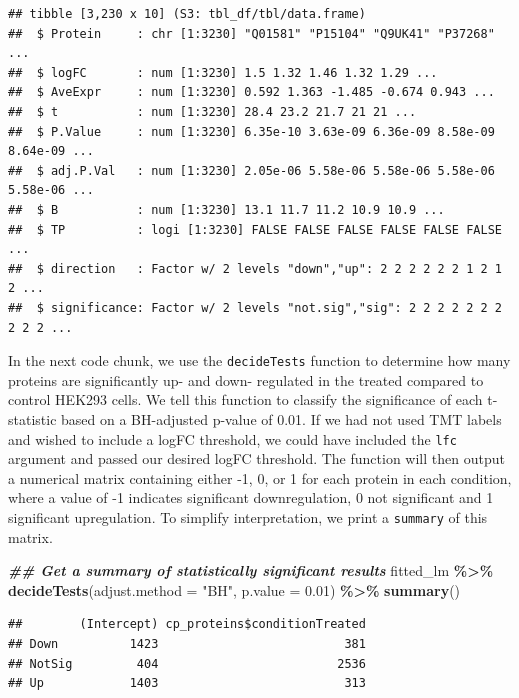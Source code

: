 \documentclass[9pt,a4paper,]{extarticle}
\newenvironment{Shaded}{\begin{snugshade}}{\end{snugshade}}
\newcommand{\AttributeTok}[1]{\textcolor[rgb]{0.13,0.29,0.53}{#1}}
\newcommand{\DocumentationTok}[1]{\textcolor[rgb]{0.56,0.35,0.01}{\textbf{\textit{#1}}}}
\newcommand{\FloatTok}[1]{\textcolor[rgb]{0.00,0.00,0.81}{#1}}
\newcommand{\FunctionTok}[1]{\textcolor[rgb]{0.13,0.29,0.53}{\textbf{#1}}}
\newcommand{\NormalTok}[1]{#1}
\newcommand{\SpecialCharTok}[1]{\textcolor[rgb]{0.81,0.36,0.00}{\textbf{#1}}}
\newcommand{\StringTok}[1]{\textcolor[rgb]{0.31,0.60,0.02}{#1}}
\begin{document}
\begin{verbatim}
## tibble [3,230 x 10] (S3: tbl_df/tbl/data.frame)
##  $ Protein     : chr [1:3230] "Q01581" "P15104" "Q9UK41" "P37268" ...
##  $ logFC       : num [1:3230] 1.5 1.32 1.46 1.32 1.29 ...
##  $ AveExpr     : num [1:3230] 0.592 1.363 -1.485 -0.674 0.943 ...
##  $ t           : num [1:3230] 28.4 23.2 21.7 21 21 ...
##  $ P.Value     : num [1:3230] 6.35e-10 3.63e-09 6.36e-09 8.58e-09 8.64e-09 ...
##  $ adj.P.Val   : num [1:3230] 2.05e-06 5.58e-06 5.58e-06 5.58e-06 5.58e-06 ...
##  $ B           : num [1:3230] 13.1 11.7 11.2 10.9 10.9 ...
##  $ TP          : logi [1:3230] FALSE FALSE FALSE FALSE FALSE FALSE ...
##  $ direction   : Factor w/ 2 levels "down","up": 2 2 2 2 2 2 1 2 1 2 ...
##  $ significance: Factor w/ 2 levels "not.sig","sig": 2 2 2 2 2 2 2 2 2 2 ...
\end{verbatim}

In the next code chunk, we use the \texttt{decideTests} function to determine how many
proteins are significantly up- and down- regulated in the treated compared to control
HEK293 cells. We tell this function to classify the significance of each
t-statistic based on a BH-adjusted p-value of 0.01. If we had not used TMT
labels and wished to include a logFC threshold, we could have included the \texttt{lfc} argument
and passed our desired logFC threshold. The function will then output a numerical
matrix containing either -1, 0, or 1 for each protein in each condition, where a
value of -1 indicates significant downregulation, 0 not significant and 1 significant
upregulation. To simplify interpretation, we print a \texttt{summary} of this matrix.

\begin{Shaded}
\begin{Highlighting}[]
\DocumentationTok{\#\# Get a summary of statistically significant results}
\NormalTok{fitted\_lm }\SpecialCharTok{\%\textgreater{}\%}
  \FunctionTok{decideTests}\NormalTok{(}\AttributeTok{adjust.method =} \StringTok{"BH"}\NormalTok{, }\AttributeTok{p.value =} \FloatTok{0.01}\NormalTok{) }\SpecialCharTok{\%\textgreater{}\%}
  \FunctionTok{summary}\NormalTok{()}
\end{Highlighting}
\end{Shaded}

\begin{verbatim}
##        (Intercept) cp_proteins$conditionTreated
## Down          1423                          381
## NotSig         404                         2536
## Up            1403                          313
\end{verbatim}
\end{document}
